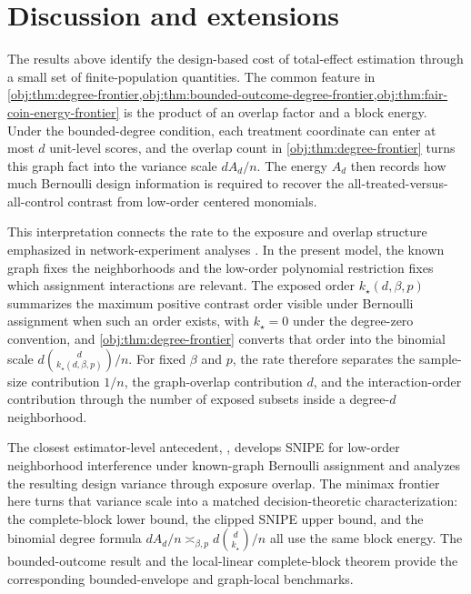 \section{Discussion and extensions}

The results above identify the design-based cost of total-effect estimation through a small set of finite-population quantities. The common feature in \cref{obj:thm:degree-frontier,obj:thm:bounded-outcome-degree-frontier,obj:thm:fair-coin-energy-frontier} is the product of an overlap factor and a block energy. Under the bounded-degree condition, each treatment coordinate can enter at most \(d\) unit-level scores, and the overlap count in \cref{obj:thm:degree-frontier} turns this graph fact into the variance scale \(dA_d/n\). The energy \(A_d\) then records how much Bernoulli design information is required to recover the all-treated-versus-all-control contrast from low-order centered monomials.

This interpretation connects the rate to the exposure and overlap structure emphasized in network-experiment analyses \citep{Leung2022,Savje2021,Hu2022,Gao2025}. In the present model, the known graph fixes the neighborhoods and the low-order polynomial restriction fixes which assignment interactions are relevant. The exposed order \(k_\star(d,\beta,p)\) summarizes the maximum positive contrast order visible under Bernoulli assignment when such an order exists, with \(k_\star=0\) under the degree-zero convention, and \cref{obj:thm:degree-frontier} converts that order into the binomial scale \(d\binom{d}{k_\star(d,\beta,p)}/n\). For fixed \(\beta\) and \(p\), the rate therefore separates the sample-size contribution \(1/n\), the graph-overlap contribution \(d\), and the interaction-order contribution through the number of exposed subsets inside a degree-\(d\) neighborhood.

The closest estimator-level antecedent, \citet{CortezRodriguezEichhornYu2023}, develops SNIPE for low-order neighborhood interference under known-graph Bernoulli assignment and analyzes the resulting design variance through exposure overlap. The minimax frontier here turns that variance scale into a matched decision-theoretic characterization: the complete-block lower bound, the clipped SNIPE upper bound, and the binomial degree formula \(dA_d/n\asymp_{\beta,p}d\binom{d}{k_\star}/n\) all use the same block energy. The bounded-outcome result and the local-linear complete-block theorem provide the corresponding bounded-envelope and graph-local benchmarks.

